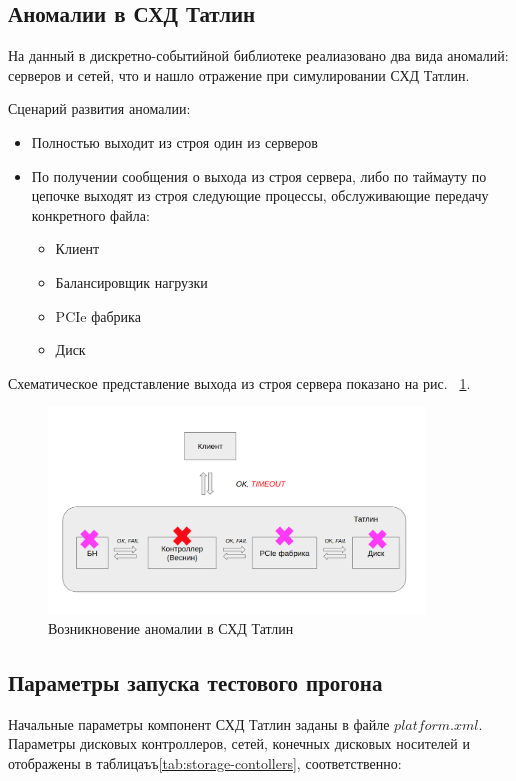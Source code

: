 \subsection{Аномалии в СХД Татлин}
На данный в дискретно-событийной библиотеке реалиазовано два вида аномалий: серверов и сетей, что и нашло отражение при симулировании СХД Татлин.

Сценарий развития аномалии:

\begin{itemize}
\item Полностью выходит из строя один из серверов 
\item По получении сообщения о выхода из строя сервера, либо по таймауту по цепочке выходят из строя следующие процессы, обслуживающие передачу конкретного файла:
	\begin{itemize}
		\item  Клиент
		\item Балансировщик нагрузки
		\item PCIe фабрика
		\item Диск
	\end{itemize}
\end{itemize}

Схематическое представление выхода из строя сервера показано на рис. ~\ref{fig:bad-tatlin}.

\begin{figure}[!ht]
\centering
\includegraphics[width=10cm]{Kenenbek/images/bad.png}
\caption{Возникновение аномалии в СХД Татлин}
\label{fig:bad-tatlin}
\end{figure}

\subsection{Параметры запуска тестового прогона}

Начальные параметры компонент СХД Татлин заданы в файле $platform.xml$. Параметры дисковых контроллеров, сетей, конечных дисковых носителей и отображены в таблицаъъ\ref{tab:storage-contollers}, соответственно:

